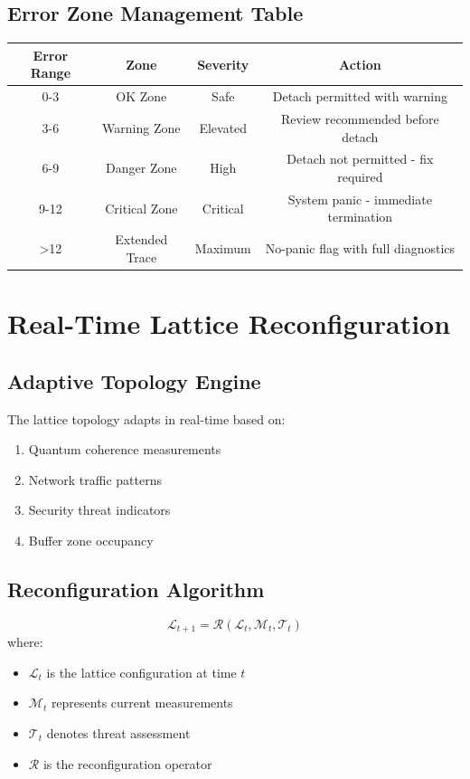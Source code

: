 \documentclass[12pt,a4paper]{article}
\begin{document}
\subsection{Error Zone Management Table}

\begin{center}
\begin{longtable}{|c|c|c|c|}
\hline
\textbf{Error Range} & \textbf{Zone} & \textbf{Severity} & \textbf{Action} \\
\hline
\endhead
0-3 & OK Zone & Safe & Detach permitted with warning \\
\hline
3-6 & Warning Zone & Elevated & Review recommended before detach \\
\hline
6-9 & Danger Zone & High & Detach not permitted - fix required \\
\hline
9-12 & Critical Zone & Critical & System panic - immediate termination \\
\hline
>12 & Extended Trace & Maximum & No-panic flag with full diagnostics \\
\hline
\end{longtable}
\end{center}

\section{Real-Time Lattice Reconfiguration}

\subsection{Adaptive Topology Engine}

The lattice topology adapts in real-time based on:
\begin{enumerate}
    \item Quantum coherence measurements
    \item Network traffic patterns
    \item Security threat indicators
    \item Buffer zone occupancy
\end{enumerate}

\subsection{Reconfiguration Algorithm}

\begin{equation}
\mathcal{L}_{t+1} = \mathcal{R}(\mathcal{L}_t, \mathcal{M}_t, \mathcal{T}_t)
\end{equation}
where:
\begin{itemize}
    \item $\mathcal{L}_t$ is the lattice configuration at time $t$
    \item $\mathcal{M}_t$ represents current measurements
    \item $\mathcal{T}_t$ denotes threat assessment
    \item $\mathcal{R}$ is the reconfiguration operator
\end{itemize}
\end{document}
